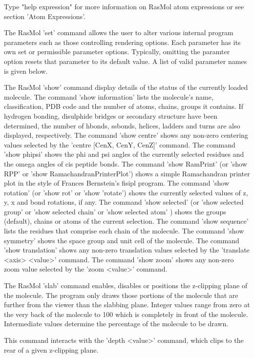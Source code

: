 Type "help expression" for more information on RasMol atom expressions or
see section
'Atom Expressions'.

The RasMol
'set'
command allows the user to alter various internal program parameters
such as those controlling rendering options. Each parameter has its
own set or permissible parameter options. Typically, omitting the
paramter option resets that parameter to its default value. A list of
valid parameter names is given below.

The RasMol
'show'
command display details of the status of the currently
loaded molecule. The command
'show information'
lists the molecule's name,
classification, PDB code and the number of atoms, chains, groups it contains.
If hydrogen bonding, disulphide bridges or secondary structure have been
determined, the number of hbonds, ssbonds, helices, ladders and turns
are also displayed, respectively. The command
'show centre'
shows any non-zero centering values selected by the
'centre [CenX, CenY, CenZ]'
command. The command
'show phipsi'
shows the phi and psi angles of the currently selected residues and
the omega angles of cis peptide bonds. The command
'show RamPrint'
(or 'show RPP' or 'show RamachandranPrinterPlot') shows a simple
Ramachandran printer plot in the style of Frances Bernstein's fisipl
program.  The command
'show rotation'
(or 'show rot' or 'show 'rotate') shows the currently selected values
of z, y, x and bond rotations, if any.
The command
'show selected'
(or 'show selected group' or 'show selected chain' or  'show selected atom' )
shows the groups (default), chains or atoms of the current selection.
The command
'show sequence'
lists the residues that comprise each chain of the molecule.  The command
'show symmetry'
shows the space group and unit cell of the molecule. The command
'show translation'
shows any non-zero translation values selected by the
'translate <axis> <value>'
command. The command
'show zoom'
shows any non-zero zoom value selected by the
'zoom <value>'
command.

The RasMol
'slab'
command enables, disables or positions the z-clipping plane of the
molecule. The program only draws those portions of the
molecule that are further from the viewer than the slabbing plane.
Integer values range from zero at the very back of the molecule to
100 which is completely in front of the molecule. Intermediate values
determine the percentage of the molecule to be drawn.

This command interacts with the
'depth <value>'
command, which clips to the rear of a given z-clipping plane.


